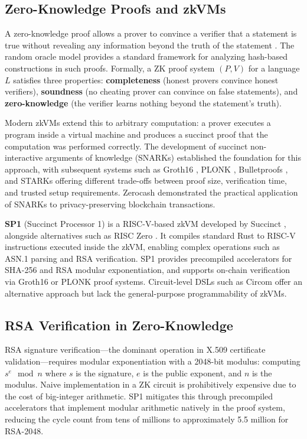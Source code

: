 \documentclass[11pt, a4paper]{article}
\begin{document}
\subsection{Zero-Knowledge Proofs and
zkVMs}\label{zero-knowledge-proofs-and-zkvms}

A zero-knowledge proof allows a prover to convince a verifier that a
statement is true without revealing any information beyond the truth of
the statement \cite{ref5}. The random oracle model \cite{ref15} provides a
standard framework for analyzing hash-based constructions in such
proofs. Formally, a ZK proof system \((P, V)\) for a language \(L\)
satisfies three properties: \textbf{completeness} (honest provers
convince honest verifiers), \textbf{soundness} (no cheating prover can
convince on false statements), and \textbf{zero-knowledge} (the verifier
learns nothing beyond the statement's truth).

Modern zkVMs extend this to arbitrary computation: a prover executes a
program inside a virtual machine and produces a succinct proof that the
computation was performed correctly. The development of succinct
non-interactive arguments of knowledge (SNARKs) \cite{ref14} established the
foundation for this approach, with subsequent systems such as Groth16
\cite{ref7}, PLONK \cite{ref16}, Bulletproofs \cite{ref31}, and STARKs \cite{ref17}
offering different trade-offs between proof size, verification time, and
trusted setup requirements. Zerocash \cite{ref32} demonstrated the practical
application of SNARKs to privacy-preserving blockchain transactions.

\textbf{SP1} (Succinct Processor 1) is a RISC-V-based zkVM developed by
Succinct \cite{ref6}, alongside alternatives such as RISC Zero \cite{ref29}. It
compiles standard Rust to RISC-V instructions executed inside the zkVM,
enabling complex operations such as ASN.1 parsing and RSA verification.
SP1 provides precompiled accelerators for SHA-256 and RSA modular
exponentiation, and supports on-chain verification via Groth16 \cite{ref7}
or PLONK \cite{ref16} proof systems. Circuit-level DSLs such as Circom
\cite{ref30} offer an alternative approach but lack the general-purpose
programmability of zkVMs.

\subsection{RSA Verification in
Zero-Knowledge}\label{rsa-verification-in-zero-knowledge}

RSA signature verification---the dominant operation in X.509 certificate
validation---requires modular exponentiation with a 2048-bit modulus:
computing \(s^e \mod n\) where \(s\) is the signature, \(e\) is the
public exponent, and \(n\) is the modulus. Naive implementation in a ZK
circuit is prohibitively expensive due to the cost of big-integer
arithmetic. SP1 mitigates this through precompiled accelerators that
implement modular arithmetic natively in the proof system, reducing the
cycle count from tens of millions to approximately 5.5 million for
RSA-2048.
\end{document}
